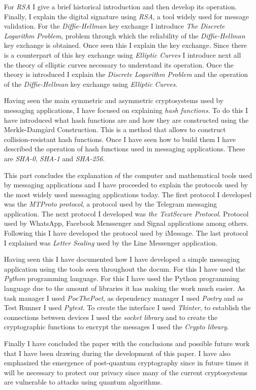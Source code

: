 For \emph{RSA} I give a brief historical introduction and then develop its operation. Finally, I explain the digital signature using \emph{RSA}, a tool widely used for message validation.
For the \emph{Diffie-Hellman} key exchange I introduce \emph{The Discrete Logarithm Problem}, problem through which the reliability of the \emph{Diffie-Hellman} key exchange is obtained. Once seen this I explain the key exchange. Since there is a counterpart of this key exchange using \emph{Elliptic Curves} I introduce next all the theory of elliptic curves necessary to understand its operation. Once the theory is introduced I explain the \emph{Discrete Logarithm Problem} and the operation of the \emph{Diffie-Hellman} key exchange using \emph{Elliptic Curves}.\par  
Having seen the main symmetric and asymmetric cryptosystems used by messaging applications, I have focused on explaining \emph{hash functions}.
To do this I have introduced what hash functions are and how they are constructed using the Merkle-Damgård Construction. This is a method that allows to construct collision-resistant hash functions. Once I have seen how to build them I have described the operation of hash functions used in messaging applications. These are \emph{SHA-0}, \emph{SHA-1} and \emph{SHA-256}.\par
This part concludes the explanation of the computer and mathematical tools used by messaging applications and I have proceeded to explain the protocols used by the most widely used messaging applications today. 
The first protocol I developed was the \emph{MTProto protocol}, a protocol used by the Telegram messaging application. 
The next protocol I developed was \emph{the TextSecure Protocol}. Protocol used by WhatsApp, Facebook Menssenger and Signal applications among others.
Following this I have developed the protocol used by iMessage.
The last protocol I explained was \emph{Letter Sealing} used by the Line Messenger application.\par
Having seen this I have documented how I have developed a simple messaging application using the tools seen throughout the docum. For this I have used the \emph{Python} programming language. For this I have used the Python programming language due to the amount of libraries it has making the work much easier. As task manager I used \emph{PoeThePoet}, as dependency manager I used \emph{Poetry} and as Test Runner I used \emph{Pytest}.
To create the interface I used \emph{Tkinter}, to establish the connections between devices I used the \emph{socket library} and to create the cryptographic functions to encrypt the messages I used the \emph{Crypto library}.\par 
Finally I have concluded the paper with the conclusions and possible future work that I have been drawing during the development of this paper. I have also emphasized the emergence of post-quantum cryptography since in future times it will be necessary to protect our privacy since many of the current cryptosystems are vulnerable to attacks using quantum algorithms.

